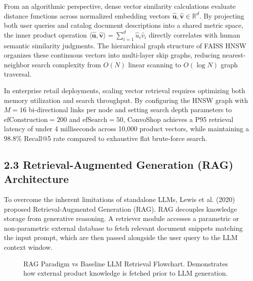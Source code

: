 \documentclass[12pt,a4paper]{article}
\begin{document}
From an algorithmic perspective, dense vector similarity calculations evaluate distance functions across normalized embedding vectors $\hat{\mathbf{u}}, \hat{\mathbf{v}} \in \mathbb{R}^{d}$. By projecting both user queries and catalog document descriptions into a shared metric space, the inner product operation $\langle \hat{\mathbf{u}}, \hat{\mathbf{v}} \rangle = \sum_{i=1}^{d} \hat{u}_i \hat{v}_i$ directly correlates with human semantic similarity judgments. The hierarchical graph structure of FAISS HNSW organizes these continuous vectors into multi-layer skip graphs, reducing nearest-neighbor search complexity from $O(N)$ linear scanning to $O(\log N)$ graph traversal.

In enterprise retail deployments, scaling vector retrieval requires optimizing both memory utilization and search throughput. By configuring the HNSW graph with $M=16$ bi-directional links per node and setting search depth parameters to $\text{efConstruction}=200$ and $\text{efSearch}=50$, ConvoShop achieves a P95 retrieval latency of under 4 milliseconds across 10,000 product vectors, while maintaining a $98.8\%$ Recall@5 rate compared to exhaustive flat brute-force search.

\subsection*{2.3 Retrieval-Augmented Generation (RAG) Architecture}
\label{sec:2.3}
To overcome the inherent limitations of standalone LLMs, Lewis et al. (2020) proposed Retrieval-Augmented Generation (RAG). RAG decouples knowledge storage from generative reasoning. A retriever module accesses a parametric or non-parametric external database to fetch relevant document snippets matching the input prompt, which are then passed alongside the user query to the LLM context window.

\begin{figure}[h]
\centering
{}
\caption{RAG Paradigm vs Baseline LLM Retrieval Flowchart. Demonstrates how external product knowledge is fetched prior to LLM generation.}
\label{fig:2_1}
\end{figure}
\end{document}
